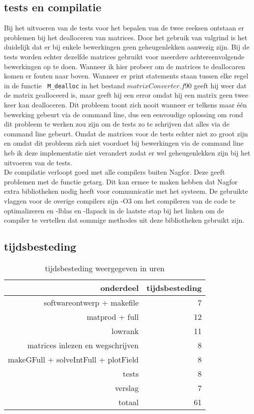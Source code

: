 \documentclass[a4paper]{article}
\begin{document}
\subsection*{tests en compilatie}
Bij het uitvoeren van de tests voor het bepalen van de twee reeksen ontstaan er problemen bij het dealloceren van matrices. Door het gebruik van valgrind is het duidelijk dat er bij enkele bewerkingen geen geheugenlekken aanwezig zijn. Bij de tests worden echter dezelfde matrices gebruikt voor meerdere achtereenvolgende bewerkingen op te doen. Wanneer ik hier probeer om de matrices te deallocaren komen er fouten naar boven. Wanneer er print statements staan tussen elke regel in de functie \verb! M_dealloc! in het bestand \(matrixConverter.f90\) geeft hij weer dat de matrix gealloceerd is, maar geeft hij een error omdat hij een matrix geen twee keer kan dealloceren. Dit probleem toont zich nooit wanneer er telkens maar \'e\'en bewerking gebeurt via de command line, dus een eenvoudige oplossing om rond dit probleem te werken zou zijn om de tests zo te schrijven dat alles via de command line gebeurt. Omdat de matrices voor de tests echter niet zo groot zijn en omdat dit probleem zich niet voordoet bij bewerkingen via de command line heb ik deze implementatie niet verandert zodat er wel geheugenlekken zijn bij het uitvoeren van de tests. \\
De compilatie verloopt goed met alle compilers buiten Nagfor. Deze geeft problemen met de functie getarg. Dit kan ermee te maken hebben dat Nagfor extra bibliotheken nodig heeft voor communicatie met het systeem. De gebruikte vlaggen voor de overige compilers zijn -O3 om het compileren van de code te optimalizeren en -lblas en -llapack in de laatste stap bij het linken om de compiler te vertellen dat sommige methodes uit deze bibliotheken gebruikt zijn.

\subsection*{tijdsbesteding}

\begin{table}
\begin{center}
\begin{tabular}{|r||r|}
\hline
onderdeel & tijdsbesteding \\\hline    
\hline
softwareontwerp + makefile & 7 \\\hline
matprod + full & 12 \\\hline
lowrank & 11 \\\hline
matrices inlezen en wegschrijven & 8 \\\hline
makeGFull + solveIntFull + plotField & 8 \\\hline
tests & 8 \\\hline
verslag & 7 \\\hline
\hline
totaal & 61 \\\hline
\end{tabular}
\end{center}
\caption{tijdsbesteding weergegeven in uren}
\label{tijdsbesteding}
\end{table}
\end{document}
